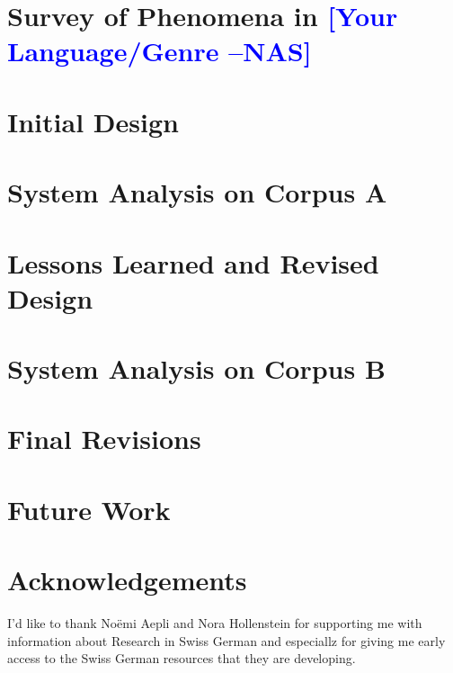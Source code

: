 \documentclass[11pt,letterpaper]{article}
\newcommand{\nascomment}[1]{\textcolor{blue}{\textbf{[#1 --NAS]}}}
\begin{document}
\section{Survey of Phenomena in \nascomment{Your Language/Genre}}


\section{Initial Design}

\section{System Analysis on Corpus A}

\section{Lessons Learned and Revised Design}

\section{System Analysis on Corpus B}

\section{Final Revisions}

\section{Future Work}


\section{Acknowledgements}
I'd like to thank Noëmi Aepli and Nora Hollenstein for supporting me with information about Research in Swiss German and especiallz for giving me early access to the Swiss German resources that they are developing. 



\label{lastpage}
\end{document}

